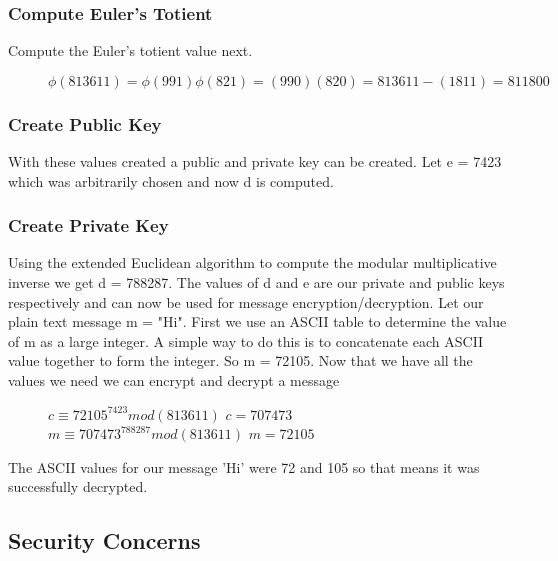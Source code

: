 \documentclass[conference]{IEEEtran}
\begin{document}
\subsubsection{Compute Euler's Totient} 
Compute the Euler's totient value next.
\begin{figure}[h]
	\begin{center}
$\phi \left(813611\right)=\phi \left(991\right)\phi \left(821\right)=\left(990\right)\left(820\right)=813611-\left(1811\right) = 811800$
\end{center}
\end{figure} 
\subsubsection{Create Public Key}
With these values created a public and private key can be created. Let e = 7423 which was arbitrarily chosen and now d is computed.
\subsubsection{Create Private Key} 
Using the extended Euclidean algorithm to compute the modular multiplicative inverse we get d = 788287. The values of d and e are our private and public keys respectively and can now be used for message encryption/decryption. \newline \indent
Let our plain text message m = "Hi". First we use an ASCII table to determine the value of m as a large integer. A simple way to do this is to concatenate each ASCII value together to form the integer. So m = 72105. Now that we have all the values we need we can encrypt and decrypt a message
\begin{figure}[h]
	\begin{center}
		$c \equiv {72105}^{7423} mod (813611)$ \newline
		$c = 707473$ \newline
		$m \equiv {707473}^{788287} mod (813611)$ \newline
		$m = 72105$ \newline
	\end{center}
\end{figure}

The ASCII values for our message 'Hi' were 72 and 105 so that means it was successfully decrypted. 


\color{red}
\subsection{Security Concerns}
\end{document}
